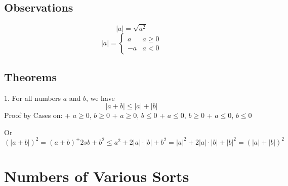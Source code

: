 \subsection*{Observations}
$$ |a| = \sqrt{a^2} $$
\begin{equation*}
       |a| =
         \begin{cases}
            a & a \geq 0 \\
           -a &  a < 0
         \end{cases}
\end{equation*}

\subsection*{Theorems}
1. For all numbers $a$ and $b$, we have
$$|a + b| \leq |a| + |b|$$
  Proof by Cases on:
    + $a \geq 0$, $b \geq 0$
    + $a \geq 0$, $b \leq 0$
    + $a \leq 0$, $b \geq 0$
    + $a \leq 0$, $b \leq 0$

  Or
  $$(|a + b|)^2 = (a+b)^ + 2sb + b^2
                \leq a^2 + 2|a| \cdot |b| + b^2
                = |a|^2 + 2|a| \cdot|b| + |b|^2
                = (|a| + |b|)^2
  $$

\section{Numbers of Various Sorts}
